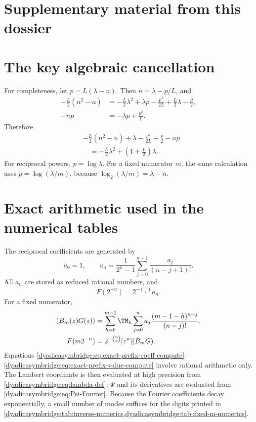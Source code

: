 \documentclass[11pt,oneside]{article}
\theoremstyle{definition}
\theoremstyle{remark}
\begin{document}
\clearpage
\section*{Supplementary material from this dossier}
\section{The key algebraic cancellation}
\label{dyadicasymbridge:app:algebra}

For completeness, let $p=L(\lambda-n)$.  Then $n=\lambda-p/L$, and
\begin{align*}
 -\frac L2(n^2-n)
 &=-\frac L2\lambda^2+\lambda p-\frac{p^2}{2L}
 +\frac L2\lambda-\frac p2,\\
 -np&=-\lambda p+\frac{p^2}{L}.
\end{align*}
Therefore
\begin{align*}
 &-\frac L2(n^2-n)+\lambda-\frac{p^2}{2L}+\frac p2-np\\
 &\quad=-\frac L2\lambda^2+
 \left(1+\frac L2\right)\lambda.
\end{align*}
For reciprocal powers, $p=\log\lambda$.  For a fixed numerator $m$, the same calculation uses
$p=\log(\lambda/m)$, because
$\log_2(\lambda/m)=\lambda-n$.

\section{Exact arithmetic used in the numerical tables}
\label{dyadicasymbridge:app:numerics}

The reciprocal coefficients are generated by
\begin{equation}
 a_0=1,
 \qquad
 a_n=\frac1{2^n-1}
 \sum_{j=0}^{n-1}\frac{a_j}{(n-j+1)!}.
\end{equation}
All $a_n$ are stored as reduced rational numbers, and
\begin{equation}
 F(2^{-n})=2^{-\binom n2}a_n.
\end{equation}
For a fixed numerator,
\begin{align}
 [z^n](B_m(z)G(z))
 &=\sum_{h=0}^{m-1}\TM_h
 \sum_{j=0}^{n}a_j
 \frac{(m-1-h)^{n-j}}{(n-j)!},                             \label{dyadicasymbridge:eq:exact-prefix-coeff-compute}\\
 F(m2^{-n})
 &=2^{-\binom n2}[z^n](B_mG).                              \label{dyadicasymbridge:eq:exact-prefix-value-compute}
\end{align}
Equations \eqref{dyadicasymbridge:eq:exact-prefix-coeff-compute}--\eqref{dyadicasymbridge:eq:exact-prefix-value-compute} involve rational arithmetic only.  The Lambert coordinate is then evaluated at high precision from
\eqref{dyadicasymbridge:eq:lambda-def}; $\Psi$ and its derivatives are evaluated from
\eqref{dyadicasymbridge:eq:Psi-Fourier}.  Because the Fourier coefficients decay exponentially, a small number of modes suffices for the digits printed in \cref{dyadicasymbridge:tab:inverse-numerics,dyadicasymbridge:tab:fixed-m-numerics}.
\end{document}
